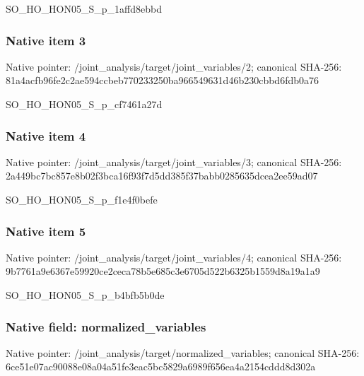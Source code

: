 \documentclass[10pt,a4paper]{article}
\begin{document}
\begingroup\raggedright\sloppy SO\_\allowbreak{}HO\_\allowbreak{}HON05\_\allowbreak{}S\_\allowbreak{}p\_\allowbreak{}1affd8ebbd\par\endgroup

\subsubsection{Native item 3}
Native pointer: /joint\_\allowbreak{}analysis/target/joint\_\allowbreak{}variables/2; canonical SHA-256: 81a4acfb96fe2c2ae594ccbeb770233250ba966549631d46b230cbbd6fdb0a76

\begingroup\raggedright\sloppy SO\_\allowbreak{}HO\_\allowbreak{}HON05\_\allowbreak{}S\_\allowbreak{}p\_\allowbreak{}cf7461a27d\par\endgroup

\subsubsection{Native item 4}
Native pointer: /joint\_\allowbreak{}analysis/target/joint\_\allowbreak{}variables/3; canonical SHA-256: 2a449bc7bc857e8b02f3bca16f93f7d5dd385f37babb0285635dcea2ee59ad07

\begingroup\raggedright\sloppy SO\_\allowbreak{}HO\_\allowbreak{}HON05\_\allowbreak{}S\_\allowbreak{}p\_\allowbreak{}f1e4f0befe\par\endgroup

\subsubsection{Native item 5}
Native pointer: /joint\_\allowbreak{}analysis/target/joint\_\allowbreak{}variables/4; canonical SHA-256: 9b7761a9e6367e59920ce2ceca78b5e685c3e6705d522b6325b1559d8a19a1a9

\begingroup\raggedright\sloppy SO\_\allowbreak{}HO\_\allowbreak{}HON05\_\allowbreak{}S\_\allowbreak{}p\_\allowbreak{}b4bfb5b0de\par\endgroup

\subsubsection{Native field: normalized\_\allowbreak{}variables}
Native pointer: /joint\_\allowbreak{}analysis/target/normalized\_\allowbreak{}variables; canonical SHA-256: 6ce51e07ac90088e08a04a51fe3eac5bc5829a6989f656ea4a2154cddd8d302a
\end{document}
